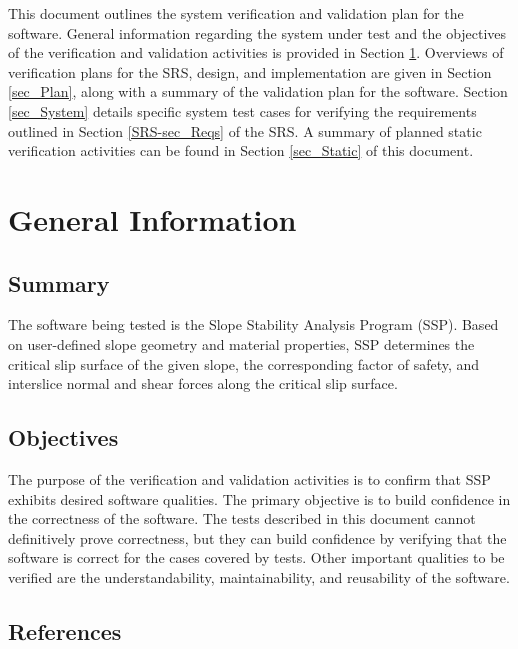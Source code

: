 \documentclass[12pt, titlepage]{article}
\newcommand{\progname}{SSP}
\begin{document}

\noindent This document outlines the system verification and validation plan 
for the software. General information regarding the system under test and the 
objectives of the verification and validation activities is provided in Section 
\ref{sec_GenInfo}. Overviews of verification plans for the SRS, design, and 
implementation are given in Section \ref{sec_Plan}, along with a summary of the 
validation plan for the software. Section \ref{sec_System} details specific  
system test cases for verifying the requirements outlined in Section 
\ref{SRS-sec_Reqs} of the SRS. A summary of planned static verification 
activities can be found in Section \ref{sec_Static} of this document.

\section{General Information} \label{sec_GenInfo}

\subsection{Summary}

\noindent The software being tested is the Slope Stability Analysis Program 
(\progname{}). Based on user-defined slope geometry and material properties, 
\progname{} determines the critical slip surface of the given slope, the 
corresponding factor of safety, and interslice normal and shear forces along 
the critical slip surface.

\subsection{Objectives}

\noindent The purpose of the verification and validation activities is to 
confirm that \progname{} exhibits desired software qualities. The primary 
objective is to build confidence in the correctness of the software. The tests 
described in this document cannot definitively prove correctness, but they can 
build confidence by verifying that the software is correct for the cases 
covered by tests. Other important qualities to be verified are the 
understandability, maintainability, and reusability of the software.

\subsection{References}
\end{document}
